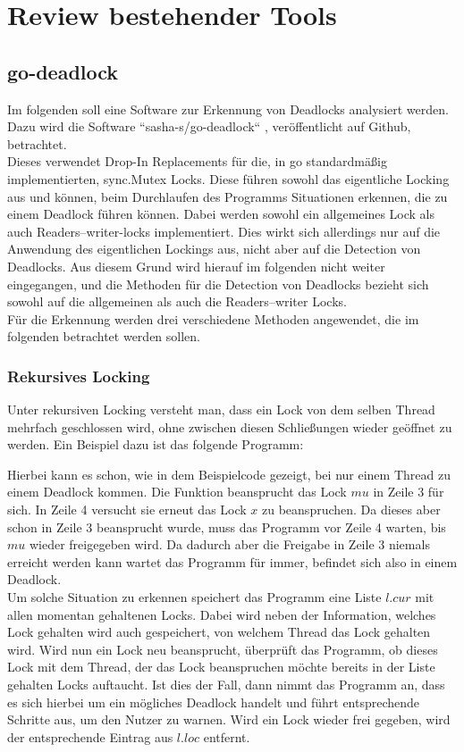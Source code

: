 \chapter{Review bestehender Tools}
\section{go-deadlock}\label{Chap::Review:go-deadlock}
Im folgenden soll eine Software zur Erkennung von Deadlocks analysiert werden.
Dazu wird die Software ``sasha-s/go-deadlock`` \cite{sasha-s}, veröffentlicht 
auf Github, betrachtet.\\
Dieses verwendet Drop-In Replacements für die, in go standardmäßig 
implementierten, sync.Mutex Locks. Diese führen sowohl das eigentliche 
Locking aus und können, beim Durchlaufen des Programms Situationen erkennen, 
die zu einem Deadlock führen können. Dabei werden sowohl ein allgemeines Lock 
als auch Readers–writer-locks implementiert. Dies wirkt sich allerdings nur auf
die Anwendung des eigentlichen Lockings aus, nicht aber auf die Detection von 
Deadlocks. Aus diesem Grund wird hierauf im folgenden nicht weiter eingegangen, 
und die Methoden für die Detection von Deadlocks bezieht sich sowohl auf die
allgemeinen als auch die Readers–writer Locks.\\
Für die Erkennung werden drei verschiedene Methoden angewendet, die im folgenden
betrachtet werden sollen.

\subsection{Rekursives Locking}
Unter rekursiven Locking versteht man, dass ein Lock von dem selben Thread 
mehrfach geschlossen wird, ohne zwischen diesen Schließungen wieder geöffnet zu
werden. Ein Beispiel dazu ist das folgende Programm:
\begin{figure}[H]
    
\end{figure}
Hierbei kann es schon, wie in dem Beispielcode gezeigt, bei nur einem Thread
zu einem Deadlock kommen. Die Funktion beansprucht das Lock $mu$ in Zeile $3$ 
für sich. In Zeile 4 versucht sie erneut das Lock $x$ zu beanspruchen. Da dieses
aber schon in Zeile 3 beansprucht wurde, muss das Programm vor Zeile 4 warten, 
bis $mu$ wieder freigegeben wird. Da dadurch aber die Freigabe in Zeile 3 
niemals erreicht werden kann wartet das Programm für immer, befindet sich also 
in einem Deadlock.\\
Um solche Situation zu erkennen speichert das Programm eine Liste $l.cur$ mit 
allen momentan gehaltenen 
Locks. Dabei wird neben der Information, welches Lock gehalten wird auch 
gespeichert, von welchem Thread das Lock gehalten wird. Wird nun ein Lock neu 
beansprucht, überprüft 
das Programm, ob dieses Lock mit dem Thread, der das Lock beanspruchen möchte 
bereits in der Liste gehalten Locks auftaucht. Ist dies der Fall, dann nimmt das
Programm an, dass es sich hierbei um ein mögliches Deadlock handelt und führt 
entsprechende Schritte aus, um den Nutzer zu warnen. Wird ein Lock wieder frei
gegeben, wird der entsprechende Eintrag aus $l.loc$ entfernt.

